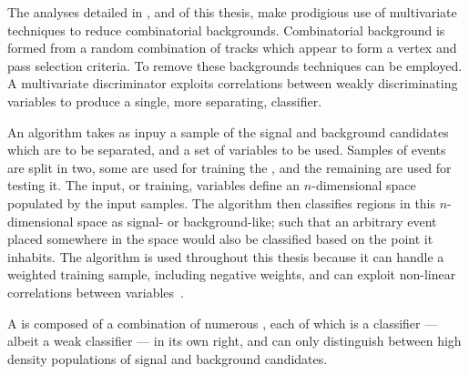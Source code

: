 The analyses detailed in ,  and  of this thesis, make
prodigious use of multivariate techniques to reduce combinatorial backgrounds.
Combinatorial background is formed from a random combination of tracks which appear to form a
vertex and pass selection criteria.
To remove these backgrounds \MVA techniques can be employed.
A multivariate discriminator exploits correlations between weakly discriminating variables to
produce a single, more separating, classifier.

An \MVA algorithm takes as inpuy a sample of the signal and background candidates which are to be
separated, and a set of variables to be used.
Samples of events are split in two, some are used for training the \MVA, and the remaining are used
for testing it.
The input, or training, variables define an $n$-dimensional space populated by the input samples.
The algorithm then classifies regions in this $n$-dimensional space as signal- or background-like;
such that an arbitrary event placed somewhere in the space would also be classified based on the
point it inhabits.
The \BDT algorithm is used throughout this thesis because it can handle
a weighted training sample, including negative weights, and can exploit non-linear correlations
between variables~\cite{Breiman,Roe}.

A \BDT is composed of a combination of numerous \DTs, each of which is a classifier
--- albeit a weak classifier ---
in its own right, and can only distinguish between high density populations of signal and
background candidates.

